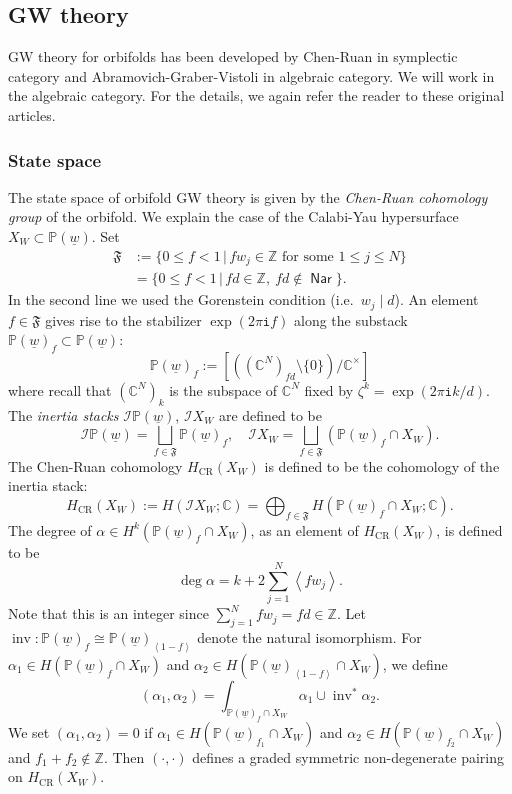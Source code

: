 \documentclass[11pt]{amsart}
\theoremstyle{definition} %
\theoremstyle{remark} %
\newcommand{\CC}{\mathbb C}
\newcommand{\PP}{\mathbb P}
\newcommand{\ZZ}{\mathbb Z}
\def\CR{\operatorname{\text{CR}}}
\def\fracp#1{\left\langle #1 \right\rangle}
\newcommand{\cI}{\mathcal{I}}
\newcommand{\frF}{\mathfrak{F}}
\newcommand{\Nar}{\operatorname{\mathsf{Nar}}}
\renewcommand{\CR}{{\operatorname{CR}}}
\newcommand{\inv}{\operatorname{inv}}
\newcommand{\iu}{\mathtt{i}}
\newcommand{\uw}{\underline{w}}
\begin{document}
\subsection{GW theory} 
GW theory for orbifolds has been developed 
by Chen-Ruan \cite{Chen-Ruan:GW} in symplectic category 
and Abramovich-Graber-Vistoli \cite{AGV} in algebraic 
category. We will work in the algebraic category. 
For the details, we again refer the reader to 
these original articles. 

\subsubsection{State space} 
\label{subsubsec:GW-statespace} 
The state space of orbifold GW theory 
is given by the \emph{Chen-Ruan cohomology group} 
of the orbifold. We explain the case of the Calabi-Yau 
hypersurface $X_W \subset \PP(\uw)$. 
Set  
\begin{align*} 
\frF &:= 
\{0\le f<1\, |\, f w_j \in \ZZ \text{ for some $1\le j\le N$}\} \\   
& = \{ 0\le f<1 \, |\, fd \in \ZZ, \ 
fd \notin \Nar\}.  
\end{align*} 
In the second line we used the Gorenstein condition 
(i.e.\ $w_j \mid d$).  
An element $f\in \frF$ gives rise to the stabilizer 
$\exp(2\pi\iu f)$ along the substack 
$\PP(\uw)_f\subset \PP(\uw)$: 
\[
\PP(\uw)_f := \left [ \left((\CC^N)_{fd}\setminus \{0\}\right)   
\Big/ \CC^\times \right] 
\]
where recall that $(\CC^N)_k$ is the subspace of $\CC^N$ 
fixed by $\zeta^k=\exp(2\pi\iu k/d)$. 
The \emph{inertia stacks} $\cI \PP(\uw)$, $\cI X_W$ are defined to be 
\[
\cI \PP(\uw) = \bigsqcup_{f\in \frF} \PP(\uw)_f, \quad 
\cI X_W = \bigsqcup_{f\in \frF} (\PP(\uw)_f \cap X_W). 
\]
The Chen-Ruan cohomology $H_{\CR}(X_W)$ 
is defined to be the cohomology of the inertia stack: 
\[
H_{\CR}(X_W) := H(\cI X_W;\CC) = 
\bigoplus_{f\in\frF} H(\PP(\uw)_f \cap X_W;\CC).  
\]
The degree of $\alpha\in H^{k}(\PP(\uw)_f\cap X_W)$, 
as an element of $H_{\CR}(X_W)$, 
is defined to be 
\begin{equation*} 
\deg \alpha = k + 2 \sum_{j=1}^N \fracp{fw_j}.  
\end{equation*} 
Note that this is an integer since $\sum_{j=1}^N f w_j = f d\in \ZZ$. 
Let $\inv \colon \PP(\uw)_f \cong \PP(\uw)_{\fracp{1-f}}$ 
denote the natural isomorphism.  
For $\alpha_1 \in H(\PP(\uw)_f \cap X_W)$ 
and $\alpha_2 \in H(\PP(\uw)_{\fracp{1-f}} \cap X_W)$, 
we define 
\begin{equation} 
\label{eq:GW-pairing} 
(\alpha_1,\alpha_2) = \int_{\PP(\uw)_f \cap X_W} 
\alpha_1 \cup \inv^* \alpha_2.  
\end{equation} 
We set $(\alpha_1,\alpha_2)=0$ if 
$\alpha_1\in H(\PP(\uw)_{f_1}\cap X_W)$ 
and $\alpha_2 \in H(\PP(\uw)_{f_2}\cap X_W)$ 
and $f_1+f_2\notin \ZZ$. 
Then $(\cdot,\cdot)$ defines a graded symmetric 
non-degenerate pairing on $H_{\CR}(X_W)$. 
\end{document}
